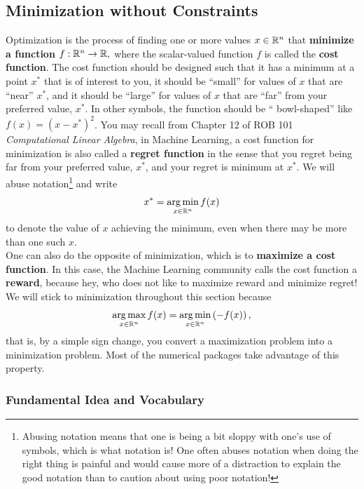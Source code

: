 \subsection{Minimization without Constraints}
\label{sec:MinNoConstraints}

Optimization is the process of finding one or more values $x\in \mathbb R^n$ that \textbf{minimize a function} $f: \mathbb R^n \to \mathbb R,$ 
where the scalar-valued function $f$ is called the \textbf{cost function}. The cost function should be designed such that it has a minimum at a point $x^\ast$ that is of interest to you, it should be ``small'' for values of $x$ that are ``near'' $x^\ast$, and it should be ``large'' for values of $x$ that are ``far'' from your preferred value, $x^\ast$. In other symbols, the function should be `` bowl-shaped'' like $f(x) = (x - x^\ast)^2$. You may recall from Chapter 12 of ROB 101 \textit{Computational Linear Algebra}, in Machine Learning, a cost function for minimization is also called a \textbf{regret function} in the sense that you regret being far from your preferred value, $x^\ast$, and your regret is minimum at $x^\ast$. We will abuse notation\footnote{Abusing notation means that one is being a bit sloppy with one's use of symbols, which is what notation is! One often abuses notation when doing the right thing is painful and would cause more of a distraction to explain the good notation than to caution about using poor notation!} and write
\begin{equation}
    \label{eq:ArgMinAbuseNotation}
    x^\ast = \operatorname*{arg\,min}_{x\in \mathbb R^n} f(x)
\end{equation}
to denote the value of $x$ achieving the minimum, even when there may be more than one such $x$.\\

One can also do the opposite of minimization, which is to \textbf{maximize a cost function}. In this case, the Machine Learning community calls the cost function a \textbf{reward}, because hey, who does not like to maximize reward and minimize regret! We will stick to minimization throughout this section because  
$$ \operatorname*{arg\,max}_{x\in \mathbb R^n} f(x) = \operatorname*{arg\,min}_{x\in \mathbb R^n} \left( -f(x) \right),$$
that is, by a simple sign change, you convert a maximization problem into a minimization problem. Most of the numerical packages take advantage of this property. 


\subsubsection{Fundamental Idea and Vocabulary}

